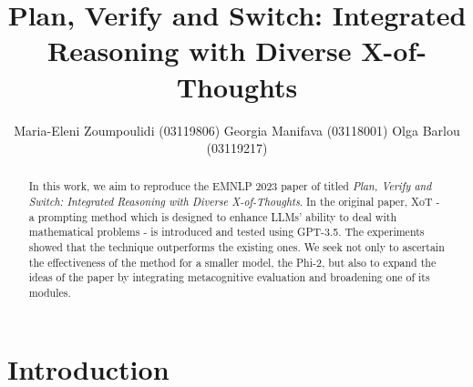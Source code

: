 \documentclass[10pt]{article} %
\title{Plan, Verify and Switch: Integrated Reasoning with Diverse X-of-Thoughts}
\author{\name Maria-Eleni Zoumpoulidi (03119806)
      \AND
      \name Georgia Manifava (03118001)
      \AND
      \name Olga Barlou (03119217)}
\begin{document}
\maketitle

\begin{abstract}
  In this work, we aim to reproduce the EMNLP 2023 paper of \citet{liu2023plan} titled \textit{Plan, Verify and Switch: Integrated Reasoning with Diverse X-of-Thoughts}. In the original paper, XoT - a prompting method which is designed to enhance LLMs' ability to deal with mathematical problems - is introduced and tested using GPT-3.5. The experiments showed that the technique outperforms the existing ones. We seek not only to ascertain the effectiveness of the method for a smaller model, the Phi-2, but also to expand the ideas of the paper by integrating metacognitive evaluation and broadening one of its modules.
\end{abstract}

\section{Introduction}




\end{document}
